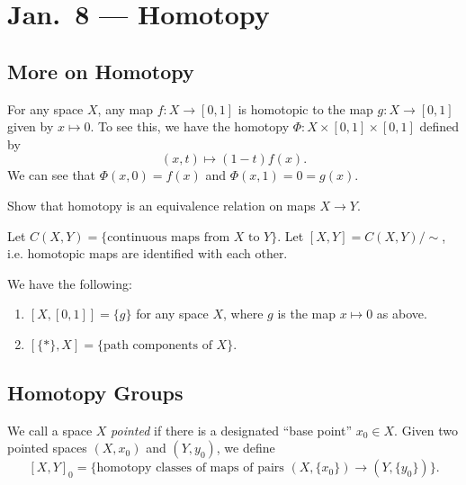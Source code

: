 \chapter{Jan.~8 --- Homotopy}

\section{More on Homotopy}

\begin{example}
  For any space $X$, any map $f : X \to [0, 1]$ is
  homotopic to the map $g : X \to [0, 1]$ given by
  $x \mapsto 0$. To see this, we have the homotopy
  $\Phi : X \times [0, 1] \times [0, 1]$ defined by
  \[
    (x, t) \mapsto (1 - t) f(x).
  \]
  We can see that $\Phi(x, 0) = f(x)$ and
  $\Phi(x, 1) = 0 = g(x)$.
\end{example}

\begin{exercise}
  Show that homotopy is an equivalence relation on
  maps $X \to Y$.
\end{exercise}

\begin{definition}
  Let $C(X, Y) = \{\text{continuous maps from $X$ to $Y$}\}$.
  Let $[X, Y] = C(X, Y) / {\sim}$, i.e. homotopic
  maps are identified with each other.
\end{definition}

\begin{example}
  We have the following:
  \begin{enumerate}
    \item $[X, [0, 1]] = \{g\}$ for any space $X$, where
      $g$ is the map $x \mapsto 0$ as above.
    \item $[\{*\}, X] = \{\text{path components of $X$}\}$.
  \end{enumerate}
\end{example}

\section{Homotopy Groups}
\begin{definition}
  We call a space $X$ \emph{pointed} if there
  is a designated ``base point'' $x_0 \in X$.
  Given two pointed spaces $(X, x_0)$ and
  $(Y, y_0)$, we define
  \[
    [X, Y]_0 = \{\text{homotopy classes of maps of pairs
    $(X, \{x_0\}) \to (Y, \{y_0\})$}\}.
  \]
\end{definition}

